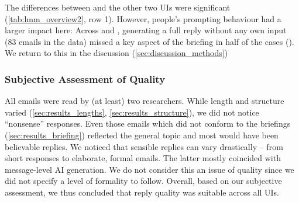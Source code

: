 The differences between \modeours{} and the other two UIs were significant (\cref{tab:lmm_overview2}, row 1). %
However, people's prompting behaviour had a larger impact here: Across \modeours{} and \modemail{}, generating a full reply without any own input (83 emails in the data) missed a key aspect of the briefing in half of the cases (). We return to this in the discussion (\cref{sec:discussion_methods})



\subsubsection{Subjective Assessment of Quality}\label{sec:result_quality}
All emails were read by (at least) two researchers. %
While length and structure varied (\cref{sec:results_lengths}, \cref{sec:results_structure}), we did not notice ``nonsense'' responses. Even those emails which did not conform to the briefings (\cref{sec:results_briefing}) reflected the general topic and most would have been believable replies. We noticed that sensible replies can vary drastically -- from short responses to elaborate, formal emails. The latter mostly coincided with message-level AI generation. We do not consider this an issue of quality since we did not specify a level of formality to follow. Overall, based on our subjective assessment, we thus concluded that reply quality was suitable across all UIs. 
